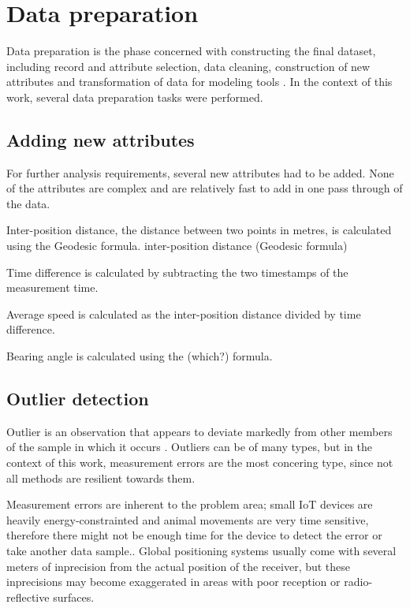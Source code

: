 
\chapter{Data preparation}

Data preparation is the phase concerned with constructing the final dataset, including record and attribute selection, data cleaning, construction of new attributes and transformation of data for modeling tools \cite{wirth2000crisp}. In the context of this work, several data preparation tasks were performed.

\section{Adding new attributes}

For further analysis requirements, several new attributes had to be added. None of the attributes are complex and are relatively fast to add in one pass through of the data.

Inter-position distance, the distance between two points in metres, is calculated using the Geodesic formula. inter-position distance (Geodesic formula)

Time difference is calculated by subtracting the two timestamps of the measurement time.

Average speed is calculated as the inter-position distance divided by time difference.

Bearing angle is calculated using the (which?) formula.

\section{Outlier detection}

Outlier is an observation that appears to deviate markedly from other members of the sample in which it occurs \cite{doi:10.1080/00401706.1969.10490657}. Outliers can be of many types, but in the context of this work, measurement errors are the most concering type, since not all methods are resilient towards them.

Measurement errors are inherent to the problem area; small IoT devices are heavily energy-constrainted and animal movements are very time sensitive, therefore there might not be enough time for the device to detect the error or take another data sample.. Global positioning systems usually come with several meters of inprecision from the actual position of the receiver, but these inprecisions may become exaggerated in areas with poor reception or radio-reflective surfaces.

